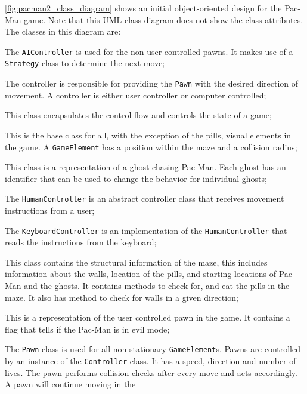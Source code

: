 %
\autoref{fig:pacman2_class_diagram} shows an initial object-oriented design for the Pac-Man game.
Note that this UML class diagram does not show the class attributes.
The classes in this diagram are:
\begin{description}[noitemsep,style=sameline,leftmargin=32mm]
	\item[AIController] The \lstinline|AIController| is used for the non user controlled pawns. It makes 
		use of a \lstinline|Strategy| class	to determine the next move;
	\item[Controller] The controller is responsible for providing the \lstinline|Pawn| with the desired 
		direction of movement. A controller is either user controller or computer controlled;
	\item[Game] This class encapsulates the control flow and controls the state of a game;
	\item[GameElement] This is the base class for all, with the exception of the pills, visual elements 
		in the game. A \lstinline|GameElement| has a position within the maze and a collision radius;
	\item[Ghost] This class is a representation of a ghost chasing Pac-Man. Each ghost has an identifier
	  that can be used to change the behavior for individual ghosts;	
	\item[HumanController] The \lstinline|HumanController| is an abstract controller class that receives movement 
		instructions from a user;
	\item[KeyboardController] The \lstinline|KeyboardController| is an implementation of the \lstinline|HumanController|
	  that reads the instructions from the keyboard;			
	\item[Level] This class contains the structural information of the maze, this includes information about the walls,
		location of the pills, and starting locations of Pac-Man and the ghosts. It contains methods to check for, and eat
		the pills in the maze. It also has method to check for walls in a given direction;
	\item[Pacman] This is a representation of the user controlled pawn in the game. It contains a flag that tells if
		the Pac-Man is in evil mode;
	\item[Pawn] The \lstinline|Pawn| class is used for all non stationary \lstinline|GameElement|s. Pawns are 
		controlled by an instance of the \lstinline|Controller| class. It has a speed, direction and number of lives.
		The pawn performs collision checks after every move and acts accordingly. A pawn will continue moving in the

\end{description}
